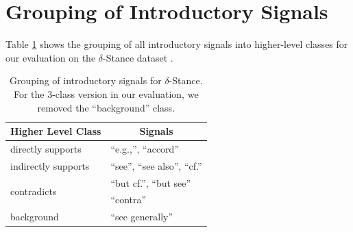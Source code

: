 \section{Grouping of Introductory Signals}
\label{section:delta_stance}

Table \ref{table:delta_stance} shows the grouping of all introductory signals into higher-level classes for our evaluation on the $\delta$-Stance dataset \cite{DBLP:conf/acl/GuptaR025}.
\begin{table}[ht]
  \centering
  \begin{tabular}{ll}
    \hline
    \textbf{Higher Level Class} & \multicolumn{1}{c}{\textbf{Signals}} \\ \hline
    directly supports & ``e.g.,'', ``accord'' \\ \hline
    indirectly supports & ``see'', ``see also'', ``cf.'' \\ \hline
    \multirow{2}{*}{contradicts} & ``but cf.'', ``but see'' \\
    & ``contra'' \\ \hline
    background & ``see generally'' \\ \hline
  \end{tabular}
  \caption{\label{table:delta_stance}
    Grouping of introductory signals for $\delta$-Stance. For the 3-class version in our evaluation, we removed the ``background'' class.
  }
\end{table}
